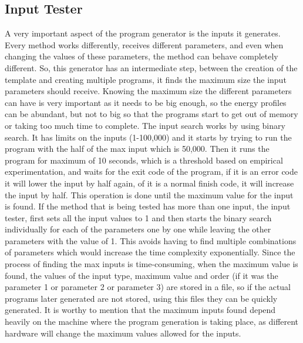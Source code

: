 \subsection{Input Tester} \label{sec:work_stage1_input_tester}

A very important aspect of the program generator is the inputs it generates. Every method works differently, receives different parameters, and even when changing the values of these parameters, the method can behave completely different. So, this generator has an intermediate step, between the creation of the template and creating multiple programs, it finds the maximum size the input parameters should receive. Knowing the maximum size the different parameters can have is very important as it needs to be big enough, so the energy profiles can be abundant, but not to big so that the programs start to get out of memory or taking too much time to complete.
The input search works by using binary search. It has limits on the inputs (1-100,000) and it starts by trying to run the program with the half of the max input which is 50,000. Then it runs the program for maximum of 10 seconds, which is a threshold based on empirical experimentation, and waits for the exit code of the program, if it is an error code it will lower the input by half again, of it is a normal finish code, it will increase the input by half. This operation is done until the maximum value for the input is found. If the method that is being tested has more than one input, the input tester, first sets all the input values to 1 and then starts the binary search individually for each of the parameters one by one while leaving the other parameters with the value of 1. This avoids having to find multiple combinations of parameters which would increase the time complexity exponentially. Since the process of finding the max inputs is time-consuming, when the maximum value is found, the values of the input type, maximum value and order (if it was the parameter 1 or parameter 2 or parameter 3) are stored in a file, so if the actual programs later generated are not stored, using this files they can be quickly generated. It is worthy to mention that the maximum inputs found depend heavily on the machine where the program generation is taking place, as different hardware will change the maximum values allowed for the inputs.

